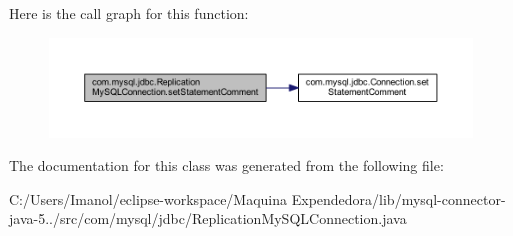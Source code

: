 Here is the call graph for this function\+:
\nopagebreak
\begin{figure}[H]
\begin{center}
\leavevmode
\includegraphics[width=350pt]{classcom_1_1mysql_1_1jdbc_1_1_replication_my_s_q_l_connection_aa7fc0fd1686f31130f8737f89087b8bd_cgraph}
\end{center}
\end{figure}


The documentation for this class was generated from the following file\+:\begin{DoxyCompactItemize}
\item 
C\+:/\+Users/\+Imanol/eclipse-\/workspace/\+Maquina Expendedora/lib/mysql-\/connector-\/java-\/5../src/com/mysql/jdbc/Replication\+My\+S\+Q\+L\+Connection.\+java\end{DoxyCompactItemize}
